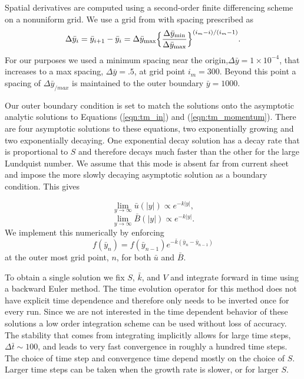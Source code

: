 	  Spatial derivatives are computed using a second-order finite differencing scheme on a nonuniform grid. We use a grid from \citet{Steinolfson1983} with spacing prescribed as
	  \begin{equation}
	   \Delta \bar{y}_i=\bar{y}_{i+1}-\bar{y}_i = \Delta\bar{y}_{\max}\Bigl\lbrace \frac{\Delta \bar{y}_{\min}}{\Delta\bar{y}_{\max}} \Bigr\rbrace^{(i_m-i)/(i_m-1)}.
      \end{equation}
For our purposes we used a minimum spacing near the origin,$\Delta \bar{y} = 1\times 10^{-4}$, that increases to a max spacing, $\Delta \bar{y} = .5$, at grid point $i_m = 300$.  Beyond this point a spacing of $\Delta \bar{y}_{/max}$ is maintained to the outer boundary $\bar{y}=1000$.
      	   	
Our outer boundary condition is set to match the solutions onto the asymptotic analytic solutions to Equations (\ref{eqn:tm_in}) and (\ref{eqn:tm_momentum}).  There are four asymptotic solutions to these equations, two exponentially growing and two exponentially decaying.	 One exponential decay solution has a decay rate that is proportional to $S$ and therefore decays much faster than the other for the large Lundquist number.  We assume that this mode is absent far from current sheet and impose the more slowly decaying asymptotic solution as a boundary condition. This gives

	\begin{equation}
	 \lim_{y \rightarrow \infty} \bar{u}(|y|) \propto e^{-k|y|},
	 \end{equation}
	 \begin{equation}
	\lim_{y \rightarrow \infty} \bar{B}(|y|) \propto e^{-k|y|}.
	\end{equation}
We implement this numerically by enforcing
	\begin{equation}
	f(\bar{y}_n) = f(\bar{y}_{n-1})e^{-\bar{k}(\bar{y}_n-\bar{y}_{n-1})}
	\end{equation}
at the outer most grid point, $n$, for both $\bar{u}$ and $\bar{B}$.
	
	
	To obtain a single solution we fix $S$, $\bar{k}$, and $V$ and integrate forward in time using a backward Euler method. The time evolution operator for this method does not have explicit time dependence and therefore only needs to be inverted once for every run.  Since we are not interested in the time dependent behavior of these solutions a low order integration scheme can be used without loss of accuracy. The stability that comes from integrating implicitly allows for large time steps, $\Delta \bar{t} \sim 100$, and leads to very fast convergence in roughly a hundred time steps.  The choice of time step and convergence time depend mostly on the choice of $S$. Larger time steps can be taken when the growth rate is slower, or for larger $S$.  
		
